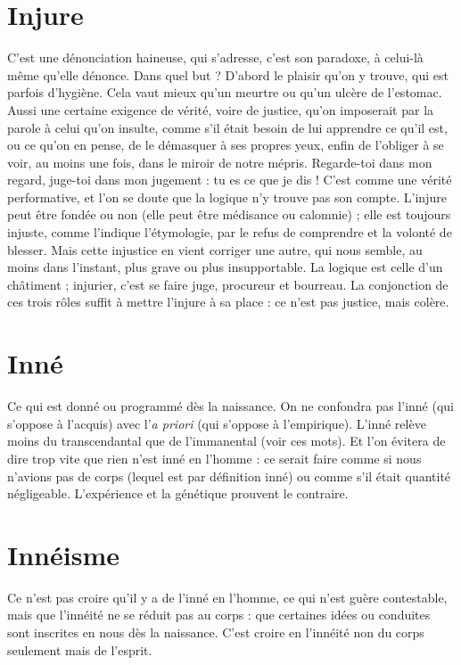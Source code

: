 \section{Injure}
C'est une dénonciation haineuse, qui s'adresse, c’est son paradoxe,
à celui-là même qu’elle dénonce. Dans quel but ? D'abord le plaisir
qu’on y trouve, qui est parfois d’hygiène. Cela vaut mieux qu’un meurtre ou
qu’un ulcère de l’estomac. Aussi une certaine exigence de vérité, voire de justice,
qu’on imposerait par la parole à celui qu’on insulte, comme s’il était
besoin de lui apprendre ce qu’il est, ou ce qu’on en pense, de le démasquer à
ses propres yeux, enfin de l’obliger à se voir, au moins une fois, dans le miroir
de notre mépris. Regarde-toi dans mon regard, juge-toi dans mon jugement :
tu es ce que je dis ! C’est comme une vérité performative, et l’on se doute que
la logique n’y trouve pas son compte. L’injure peut être fondée ou non (elle
peut être médisance ou calomnie) ; elle est toujours injuste, comme l'indique
l’étymologie, par le refus de comprendre et la volonté de blesser. Mais cette
injustice en vient corriger une autre, qui nous semble, au moins dans l'instant,
plus grave ou plus insupportable. La logique est celle d’un châtiment ; injurier,
c’est se faire juge, procureur et bourreau. La conjonction de ces trois rôles suffit
à mettre l’injure à sa place : ce n’est pas justice, mais colère.

\section{Inné}
Ce qui est donné ou programmé dès la naissance. On ne confondra
pas l’inné (qui s’oppose à l’acquis) avec l’{\it a priori} (qui s’oppose à l'empirique).
L’inné relève moins du transcendantal que de l’immanental (voir ces mots).
Et l’on évitera de dire trop vite que rien n’est inné en l’homme : ce serait faire
comme si nous n'avions pas de corps (lequel est par définition inné) ou comme s’il
était quantité négligeable. L'expérience et la génétique prouvent le contraire.

\section{Innéisme}
Ce n’est pas croire qu’il y a de l’inné en l’homme, ce qui n’est
guère contestable, mais que l’innéité ne se réduit pas au corps :
que certaines idées ou conduites sont inscrites en nous dès la naissance. C’est
croire en l’innéité non du corps seulement mais de l'esprit.

